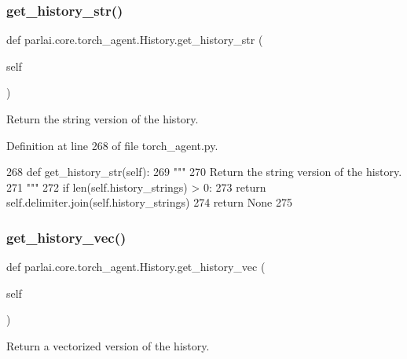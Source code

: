 \subsubsection{\texorpdfstring{get\+\_\+history\+\_\+str()}{get\_history\_str()}}
{\footnotesize\ttfamily def parlai.\+core.\+torch\+\_\+agent.\+History.\+get\+\_\+history\+\_\+str (\begin{DoxyParamCaption}\item[{}]{self }\end{DoxyParamCaption})}

\begin{DoxyVerb}Return the string version of the history.
\end{DoxyVerb}
 

Definition at line 268 of file torch\+\_\+agent.\+py.


\begin{DoxyCode}
268     \textcolor{keyword}{def }get\_history\_str(self):
269         \textcolor{stringliteral}{"""}
270 \textcolor{stringliteral}{        Return the string version of the history.}
271 \textcolor{stringliteral}{        """}
272         \textcolor{keywordflow}{if} len(self.history\_strings) > 0:
273             \textcolor{keywordflow}{return} self.delimiter.join(self.history\_strings)
274         \textcolor{keywordflow}{return} \textcolor{keywordtype}{None}
275 
\end{DoxyCode}
\mbox{\label{classparlai_1_1core_1_1torch__agent_1_1History_a0d9c7a847af118f77e9986279acf7dea}} 
\subsubsection{\texorpdfstring{get\+\_\+history\+\_\+vec()}{get\_history\_vec()}}
{\footnotesize\ttfamily def parlai.\+core.\+torch\+\_\+agent.\+History.\+get\+\_\+history\+\_\+vec (\begin{DoxyParamCaption}\item[{}]{self }\end{DoxyParamCaption})}

\begin{DoxyVerb}Return a vectorized version of the history.
\end{DoxyVerb}
 

